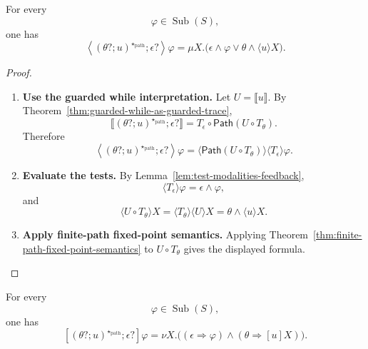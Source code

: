 \begin{theorem}
\label{thm:guarded-while-diamond-feedback}
For every
\[
  \varphi\in\operatorname{Sub}(S),
\]
one has
\[
  \left\langle
    (\theta?;u)^{\star_{\mathrm{path}}};\epsilon?
  \right\rangle\varphi
  =
  \mu X.
  \bigl(
    \epsilon\wedge\varphi
    \vee
    \theta\wedge\langle u\rangle X
  \bigr).
\]
\end{theorem}

\begin{proof}
\begin{enumerate}
  \item \textbf{Use the guarded while interpretation.}
  Let \(U=\llbracket u\rrbracket\). By
  Theorem~\ref{thm:guarded-while-as-guarded-trace},
  \[
    \llbracket
      (\theta?;u)^{\star_{\mathrm{path}}};\epsilon?
    \rrbracket
    =
    T_\epsilon\circ\mathsf{Path}(U\circ T_\theta).
  \]
  Therefore
  \[
    \left\langle
      (\theta?;u)^{\star_{\mathrm{path}}};\epsilon?
    \right\rangle\varphi
    =
    \langle\mathsf{Path}(U\circ T_\theta)\rangle
    \langle T_\epsilon\rangle\varphi.
  \]

  \item \textbf{Evaluate the tests.}
  By Lemma~\ref{lem:test-modalities-feedback},
  \[
    \langle T_\epsilon\rangle\varphi
    =
    \epsilon\wedge\varphi,
  \]
  and
  \[
    \langle U\circ T_\theta\rangle X
    =
    \langle T_\theta\rangle\langle U\rangle X
    =
    \theta\wedge\langle u\rangle X.
  \]

  \item \textbf{Apply finite-path fixed-point semantics.}
  Applying Theorem~\ref{thm:finite-path-fixed-point-semantics} to
  \(U\circ T_\theta\) gives the displayed formula.
\end{enumerate}
\end{proof}

\begin{theorem}
\label{thm:guarded-while-box-feedback}
For every
\[
  \varphi\in\operatorname{Sub}(S),
\]
one has
\[
  \left[
    (\theta?;u)^{\star_{\mathrm{path}}};\epsilon?
  \right]\varphi
  =
  \nu X.
  \bigl(
    (\epsilon\Rightarrow\varphi)
    \wedge
    (\theta\Rightarrow[u]X)
  \bigr).
\]
\end{theorem}


